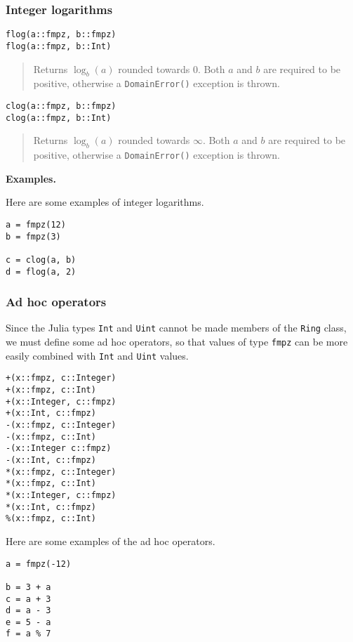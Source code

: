 \documentclass[a4paper,10pt]{article}
\newcommand{\code}{\lstinline}
\newcommand{\desc}[1]{\vspace{-3mm}\begin{quote}#1\end{quote}}
\begin{document}
{{\subsubsection{Integer logarithms}

\begin{lstlisting}
flog(a::fmpz, b::fmpz)
flog(a::fmpz, b::Int)
\end{lstlisting}

\desc{Returns $\log_b(a)$ rounded towards $0$. Both $a$ and $b$ are required
to be positive, otherwise a \code{DomainError()} exception is thrown.}

\begin{lstlisting}
clog(a::fmpz, b::fmpz)
clog(a::fmpz, b::Int)
\end{lstlisting}

\desc{Returns $\log_b(a)$ rounded towards $\infty$. Both $a$ and $b$ are required
to be positive, otherwise a \code{DomainError()} exception is thrown.}

\textbf{Examples.}

Here are some examples of integer logarithms.

\begin{lstlisting}
a = fmpz(12)
b = fmpz(3)

c = clog(a, b)
d = flog(a, 2)
\end{lstlisting}

\subsubsection{Ad hoc operators}

Since the Julia types \code{Int} and \code{Uint} cannot be made members of the
\code{Ring} class, we must define some ad hoc operators, so that values of type
\code{fmpz} can be more easily combined with \code{Int} and \code{Uint} values.

\begin{lstlisting}
+(x::fmpz, c::Integer)
+(x::fmpz, c::Int)
+(x::Integer, c::fmpz)
+(x::Int, c::fmpz)
-(x::fmpz, c::Integer)
-(x::fmpz, c::Int)
-(x::Integer c::fmpz)
-(x::Int, c::fmpz)
*(x::fmpz, c::Integer)
*(x::fmpz, c::Int)
*(x::Integer, c::fmpz)
*(x::Int, c::fmpz)
%(x::fmpz, c::Int)
\end{lstlisting}

Here are some examples of the ad hoc operators.

\begin{lstlisting}
a = fmpz(-12)

b = 3 + a
c = a + 3
d = a - 3
e = 5 - a
f = a % 7
\end{lstlisting}

}}
\end{document}
